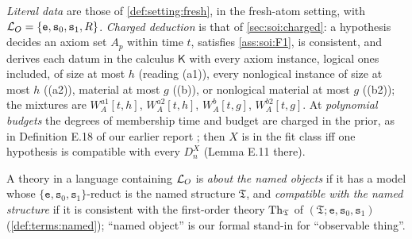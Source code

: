 \begin{definition}\label{def:terms:literal}
\emph{Literal data} are those of \cref{def:setting:fresh}, in the fresh-atom setting, with $\mathcal{L}_{O}=\{\mathtt e,\mathtt s_0,\mathtt s_1,R\}$. \emph{Charged deduction} is that of \cref{sec:soi:charged}: a hypothesis decides an axiom set $A_p$ within time $t$, satisfies \cref{ass:soi:F1}, is consistent, and derives each datum in the calculus $\mathsf K$ with every axiom instance, logical ones included, of size at most $h$ (reading (a1)), every nonlogical instance of size at most $h$ ((a2)), material at most $g$ ((b)), or nonlogical material at most $g$ ((b2)); the mixtures are $W_A^{a1}[t,h]$, $W_A^{a2}[t,h]$, $W_A^{b}[t,g]$, $W_A^{b2}[t,g]$. At \emph{polynomial budgets} the degrees of membership time and budget are charged in the prior, as in Definition E.18 of our earlier report \citep{claude2026axiominduction}; then $X$ is in the fit class iff one hypothesis is compatible with every $D^X_n$ (Lemma E.11 there).
\end{definition}

A theory in a language containing $\mathcal{L}_{O}$ is \emph{about the named objects} if it has a model whose $\{\mathtt e,\mathtt s_0,\mathtt s_1\}$-reduct is the named structure $\mathfrak T$, and \emph{compatible with the named structure} if it is consistent with the first-order theory $\mathrm{Th}_{\mathfrak{T}}$ of $(\mathfrak T;\mathtt e,\mathtt s_0,\mathtt s_1)$ (\cref{def:terms:named}); ``named object'' is our formal stand-in for ``observable thing''.

